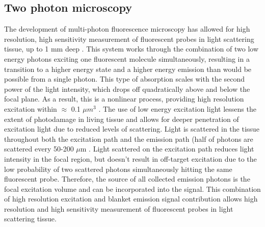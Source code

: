 \subsection{Two photon microscopy}
The development of multi-photon fluorescence microscopy has allowed for high resolution, high sensitivity measurement of fluorescent probes in light scattering tissue, up to 1 mm deep \citep{Denk1990, Oheim2001, Theer2003}. This system works through the combination of two low energy photons exciting one fluorescent molecule simultaneously, resulting in a transition to a higher energy state and a higher energy emission than would be possible from a single photon. This type of absorption scales with the second power of the light intensity, which drops off quadratically above and below the focal plane. As a result, this is a nonlinear process, providing high resolution excitation within $ \approx $ 0.1 $ \mu m^3 $ \citep{Zipfel2003}. The use of low energy excitation light lessens the extent of photodamage in living tissue and allows for deeper penetration of excitation light due to reduced levels of scattering. Light is scattered in the tissue throughout both the excitation path and the emission path (half of photons are scattered every 50-200 $\mu$m  \citep{Oheim2001,Yaroslavsky2002}. Light scattered on the excitation path reduces light intensity in the focal region, but doesn't result in off-target excitation due to the low probability of two scattered photons simultaneously hitting the same fluorescent probe. Therefore, the source of all collected emission photons is the focal excitation volume and can be incorporated into the signal. This combination of high resolution excitation and blanket emission signal contribution allows high resolution and high sensitivity measurement of fluorescent probes in light scattering tissue.

